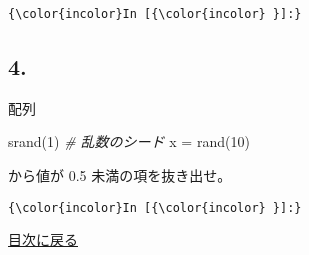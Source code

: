 \documentclass[a4paper,dvipdfmx,uplatex]{jsarticle}
\newenvironment{Shaded}{}{}
\newcommand{\FloatTok}[1]{\textcolor[rgb]{0.25,0.63,0.44}{{#1}}}
\newcommand{\CommentTok}[1]{\textcolor[rgb]{0.38,0.63,0.69}{\textit{{#1}}}}
\newcommand{\NormalTok}[1]{{#1}}
\begin{document}
    \begin{Verbatim}[commandchars=\\\{\}]
{\color{incolor}In [{\color{incolor} }]:} 
\end{Verbatim}

    \subsection{4.}\label{section}

配列

\begin{Shaded}
\begin{Highlighting}[]
    \NormalTok{srand(}\FloatTok{1}\NormalTok{) }\CommentTok{# 乱数のシード}
    \NormalTok{x = rand(}\FloatTok{10}\NormalTok{)}
\end{Highlighting}
\end{Shaded}

から値が 0.5 未満の項を抜き出せ。

    \begin{Verbatim}[commandchars=\\\{\}]
{\color{incolor}In [{\color{incolor} }]:} 
\end{Verbatim}

    \protect\hyperlink{ux76eeux6b21}{目次に戻る}


    
    
    
    
\end{document}
